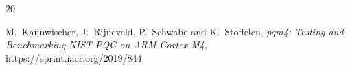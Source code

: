 \documentclass{llncs}
\newcommand{\GF}{GF}
\begin{document}
\begin{thebibliography}{20}










M.~Kannwischer, J.~Rijneveld, P.~Schwabe and K.~Stoffelen,
\emph{pqm4: Testing and Benchmarking NIST PQC on ARM Cortex-M4},\\
\url{https://eprint.iacr.org/2019/844}


\end{thebibliography}
\end{document}
